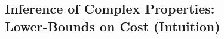 \documentclass{article}
\renewcommand{\_}{\char'137}
\begin{document}


\subsection{Inference of Complex Properties: \\ 
Lower-Bounds on Cost (Intuition)}
\end{document}
